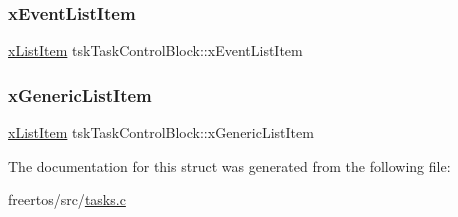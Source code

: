 \mbox{\label{structtsk_task_control_block_a9b0ee1554f116853c7631dc0b585ffdc}} 
\subsubsection{\texorpdfstring{x\+Event\+List\+Item}{xEventListItem}}
{\footnotesize\ttfamily \mbox{\hyperlink{list_8h_abc3e65a10b5c5f39142e64e69311797f}{x\+List\+Item}} tsk\+Task\+Control\+Block\+::x\+Event\+List\+Item}

\mbox{\label{structtsk_task_control_block_a95eb5853a94644043605770f63ac9a63}} 
\subsubsection{\texorpdfstring{x\+Generic\+List\+Item}{xGenericListItem}}
{\footnotesize\ttfamily \mbox{\hyperlink{list_8h_abc3e65a10b5c5f39142e64e69311797f}{x\+List\+Item}} tsk\+Task\+Control\+Block\+::x\+Generic\+List\+Item}



The documentation for this struct was generated from the following file\+:\begin{DoxyCompactItemize}
\item 
freertos/src/\mbox{\hyperlink{tasks_8c}{tasks.\+c}}\end{DoxyCompactItemize}

